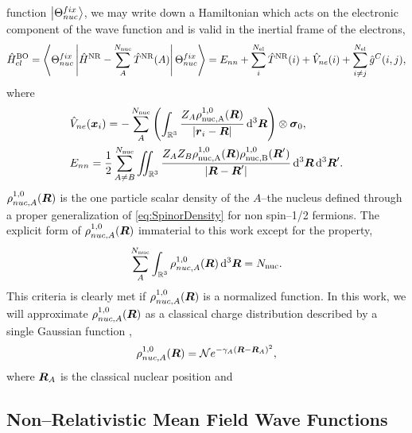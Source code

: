 function $\left\vert \Theta_{nuc}^{fix} \right\rangle$, we may write down a Hamiltonian which acts on the electronic 
component of the wave function and is valid in the inertial frame of the electrons,
\begin{equation}
\label{eq:NRBOH}
\hat{H}^{\mathrm{BO}}_{el} = \left\langle \Theta_{nuc}^{fix} \left\vert \hat{H}^{\mathrm{NR}} - \sum_A^{N_\mathrm{nuc}}\hat{T}^{\mathrm{NR}}(A) \right\vert \Theta_{nuc}^{fix} \right\rangle
=E_{nn} + \sum_i^{N_\mathrm{el}} \hat{T}^{\mathrm{NR}}(i) + \hat{V}_{ne}(i) + \sum_{i\neq j}^{N_\mathrm{el}} \hat{g}^C(i,j),
\end{equation}
where
\begin{align}
  &\hat{V}_{ne}(\boldsymbol{x}_i) = 
    -\sum^{N_\mathrm{nuc}}_A \left(\int_{\mathbb R^3} \frac{Z_A\rho^{1,0}_\mathrm{nuc,A}(\boldsymbol{R})}{\vert \boldsymbol{r}_i - \boldsymbol{R} \vert} \,\mathrm{d}^3\boldsymbol{R}\right) \otimes \boldsymbol{\sigma}_{0}, \label{eq:Vne}\\
&E_{nn} = \frac{1}{2} \sum^{N_\mathrm{nuc}}_{A\neq B} \int\mkern-12mu\int_{\mathbb R^3} \frac{Z_AZ_B\rho^{1,0}_\mathrm{nuc,A}(\boldsymbol{R})\rho^{1,0}_\mathrm{nuc,B}(\boldsymbol{R}')}{\vert \boldsymbol{R} - \boldsymbol{R}' \vert} \,\mathrm{d}^3\boldsymbol{R} \,\mathrm{d}^3\boldsymbol{R}'.
\end{align}
$\rho^{1,0}_{nuc,A}(\boldsymbol{R})$ is the one particle scalar density of the $A$--the nucleus defined through a proper generalization of
\cref{eq:SpinorDensity} for non spin--1/2 fermions. The explicit form of $\rho^{1,0}_{nuc,A}(\boldsymbol{R})$ immaterial
to this work except for the property,
\begin{equation}
\sum_A^{N_\mathrm{nuc}} \int_{\mathbb R^3} \rho_{nuc,A}^{1,0}(\boldsymbol{R}) \,\mathrm{d}^3\boldsymbol{R} = N_\mathrm{nuc}.
\end{equation}
This criteria is clearly met if $\rho^{1,0}_{nuc,A}(\boldsymbol{R})$ is a normalized function. In this work, we will approximate
$\rho^{1,0}_{nuc,A}(\boldsymbol{R})$ as a classical charge distribution described by a single Gaussian function \cite{Dyall97_207,Saue98_920},
\begin{equation}
  \label{eq:GauNuc}
\rho^{1,0}_{nuc,A}(\boldsymbol{R}) = \mathcal{N} e^{-\gamma_A(\boldsymbol{R} - \boldsymbol{R}_A)^2},
\end{equation}
where $\boldsymbol{R}_A$ is the classical nuclear position and 



\subsection{Non--Relativistic Mean Field Wave Functions}


